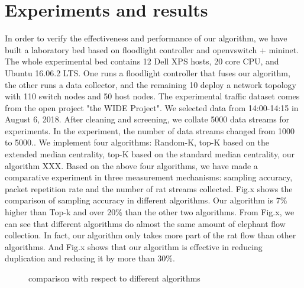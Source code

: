 \documentclass[conference,compsoc]{IEEEtran}
\begin{document}
\section{Experiments and results}
In order to verify the effectiveness and performance of our algorithm, we have built a laboratory bed based on floodlight controller and openvswitch + mininet. The whole experimental bed contains 12 Dell XPS hosts, 20 core CPU, and Ubuntu 16.06.2 LTS. One runs a floodlight controller that fuses our algorithm, the other runs a data collector, and the remaining 10 deploy a network topology with 110 switch nodes and 50 host nodes. The experimental traffic dataset comes from the open project "the WIDE Project". We selected data from 14:00-14:15 in August 6, 2018. After cleaning and screening, we collate 5000 data streams for experiments. In the experiment, the number of data streams changed from 1000 to 5000..
We implement four algorithms: Random-K, top-K based on the extended median centrality, top-K based on the standard median centrality, our algorithm XXX. Based on the above four algorithms, we have made a comparative experiment in three measurement mechanisms: sampling accuracy, packet repetition rate and the number of rat streams collected.
Fig.x shows the comparison of sampling accuracy in different algorithms. Our algorithm is 7\% higher than Top-k and over 20\% than the other two algorithms. From Fig.x, we can see that different algorithms do almost the same amount of elephant flow collection. In fact, our algorithm only takes more part of the rat flow than other algorithms. And Fig.x shows that our algorithm is effective in reducing duplication and reducing it by more than 30\%.


\begin{figure}[!!!!!!!!!!!!!!hhhhhhhhhht]
\centering
{}
\caption{comparison with respect to different algorithms}
\label{fig_x_cmp}
\end{figure}
\end{document}
